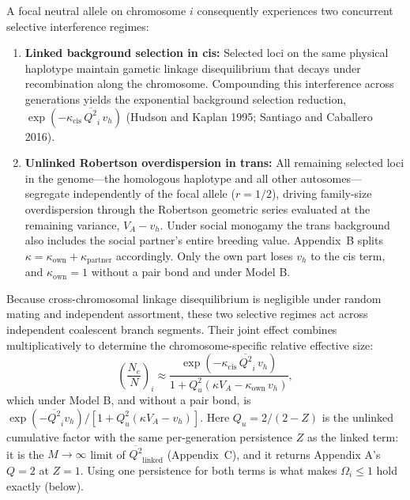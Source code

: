 \documentclass[12pt]{article}
\begin{document}
A focal neutral allele on chromosome $i$ consequently experiences two concurrent selective interference regimes:
\begin{enumerate}
    \item \textbf{Linked background selection in cis:} Selected loci on the same physical haplotype maintain gametic linkage disequilibrium that decays under recombination along the chromosome. Compounding this interference across generations yields the exponential background selection reduction, $\exp\left(-\kappa_\text{cis}\,\overline{Q^2}_i\,v_h\right)$ (Hudson and Kaplan 1995; Santiago and Caballero 2016).
    \item \textbf{Unlinked Robertson overdispersion in trans:} All remaining selected loci in the genome—the homologous haplotype and all other autosomes—segregate independently of the focal allele ($r = 1/2$), driving family-size overdispersion through the Robertson geometric series evaluated at the remaining variance, $V_A - v_h$. Under social monogamy the trans background also includes the social partner's entire breeding value. Appendix~B splits $\kappa = \kappa_\text{own} + \kappa_\text{partner}$ accordingly. Only the own part loses $v_h$ to the cis term, and $\kappa_\text{own} = 1$ without a pair bond and under Model B.
\end{enumerate}
Because cross-chromosomal linkage disequilibrium is negligible under random mating and independent assortment, these two selective regimes act across independent coalescent branch segments. Their joint effect combines multiplicatively to determine the chromosome-specific relative effective size:
\begin{equation}
    \left(\frac{N_e}{N}\right)_i \approx \frac{\exp\left(-\kappa_\text{cis}\,\overline{Q^2}_i\,v_h\right)}{1 + Q_u^2(\kappa V_A - \kappa_\text{own}\,v_h)}, \label{total_red}
\end{equation}
which under Model B, and without a pair bond, is $\exp(-\overline{Q^2}_i v_h)/[1 + Q_u^2(\kappa V_A - v_h)]$. Here $Q_u = 2/(2-Z)$ is the unlinked cumulative factor with the same per-generation persistence $Z$ as the linked term: it is the $M \to \infty$ limit of $\overline{Q^2}_\text{linked}$ (Appendix~C), and it returns Appendix A's $Q = 2$ at $Z = 1$. Using one persistence for both terms is what makes $\Omega_i \le 1$ hold exactly (below).
\end{document}
